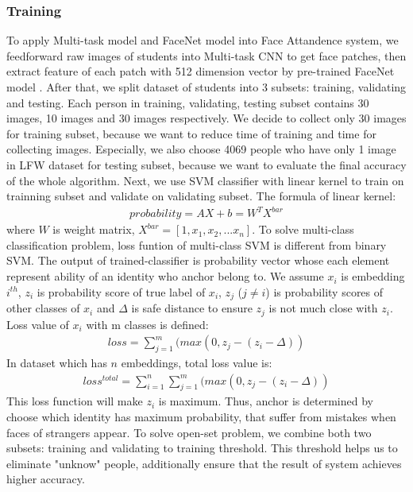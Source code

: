 \documentclass[journal, twocolumn]{IEEEtran}
\begin{document}
\subsubsection{Training} 
To apply Multi-task model and FaceNet model into Face Attandence system, we feedforward raw images of students into Multi-task CNN to get face patches, then extract feature of each patch with 512 dimension vector by pre-trained FaceNet model \cite{ref:facenet}. After that, we split dataset of students into 3 subsets: training, validating and testing. Each person in training, validating, testing subset contains 30 images, 10 images and 30 images respectively. We decide to collect only 30 images for training subset, because we want to reduce time of training and time for collecting images. Especially, we also choose 4069 people who have only 1 image in LFW dataset \cite{ref:data-lfw} for testing subset, because we want to evaluate the final accuracy of the whole algorithm. Next, we use SVM classifier with linear kernel to train on trainning subset and validate on validating subset. The formula of linear kernel:
\begin{align}
	probability = AX + b = W^TX^{bar} 
\end{align}
where $W$ is weight matrix, $X^{bar}=[1,x_1,x_2,...x_n]$. To solve multi-class classification problem, loss funtion of multi-class SVM is different from binary SVM. The output of trained-classifier is probability vector whose each element represent ability of an identity who anchor belong to. We assume $x_i$ is embedding $i^{th}$, $z_i$ is probability score of true label of $x_i$, $z_j$ ($j\ne i$) is probability scores of other classes of $x_i$ and $\Delta$ is safe distance to ensure $z_j$ is not much close with $z_i$. Loss value of $x_i$ with m classes is defined:
\begin{align}
	loss = \sum_{j=1}^m(max(0,z_j-(z_i-\Delta))
\end{align}
In dataset which has $n$ embeddings, total loss value is:
\begin{align}
	loss^{total} = \sum_{i=1}^n\sum_{j=1}^m(max(0,z_j-(z_i-\Delta))
\end{align}
This loss function will make $z_i$ is maximum. Thus, anchor is determined by choose which identity has maximum probability, that suffer from mistakes when faces of strangers appear. To solve open-set problem, we combine both two subsets: training and validating to training threshold. This threshold helps us to eliminate "unknow" people, additionally ensure that the result of system achieves higher accuracy.
\end{document}
